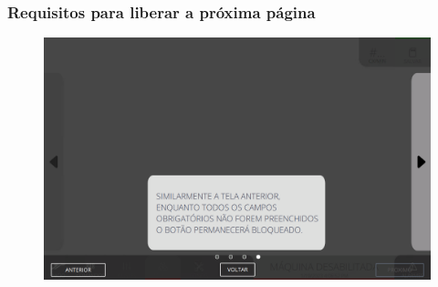 \newpage
\thispagestyle{fancy}
\vspace*{40 pt}
\subsubsection{\small{Requisitos para liberar a próxima página}} \label{sec:telaNovoPedidoP2RequisitosLiberarProximaPagina}
\vspace*{\fill}
\begin{figure}[h]
    \centering
    \includegraphics[width=576 px,height=360 px]{src/imagesICV/09-request/new/e-9.png}
\end{figure}
\vspace*{\fill}
